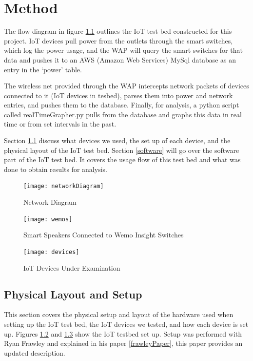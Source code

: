 \chapter{Method}
\label{Method}
The flow diagram in figure \ref{fig:network} outlines the IoT test bed constructed for this project. IoT devices pull power from the outlets through the smart switches, which log the power usage, and the WAP will query the smart switches for that data and pushes it to an AWS (Amazon Web Services)\cite{rds} MySql\cite{mysql} database as an entry in the `power' table.

The wireless net provided through the WAP intercepts network packets of devices connected to it (IoT devices in tesbed), parses them into power and network entries, and pushes them to the database. Finally, for analysis, a python script called realTimeGrapher.py pulls from the database and graphs this data in real time or from set intervals in the past.

Section \ref{Physical Layout and Setup} discuss what devices we used, the set up of each device, and the physical layout of the IoT test bed. Section \ref{software} will go over the software part of the IoT test bed. It covers the usage flow of this test bed and what was done to obtain results for analysis.

\begin{figure}[H]
    \centering
    \texttt{[image: networkDiagram]}
    \caption{Network Diagram}
    \label{fig:network}
\end{figure}

\begin{figure}[H]
    \centering
    \texttt{[image: wemos]}
    \caption{Smart Speakers Connected to Wemo Insight Switches}
    \label{fig:wemo}
\end{figure}

\begin{figure}[H]
    \centering
    \texttt{[image: devices]}
    \caption{IoT Devices Under Examination}
    \label{fig:devices}
\end{figure}

\section{Physical Layout and Setup}
\label{Physical Layout and Setup}

This section covers the physical setup and layout of the hardware used when setting up the IoT test bed, the IoT devices we tested, and how each device is set up. Figures \ref{fig:wemo} and \ref{fig:devices} show the IoT testbed set up. Setup was performed with Ryan Frawley and explained in his paper \ref{frawleyPaper}, this paper provides an updated description.

